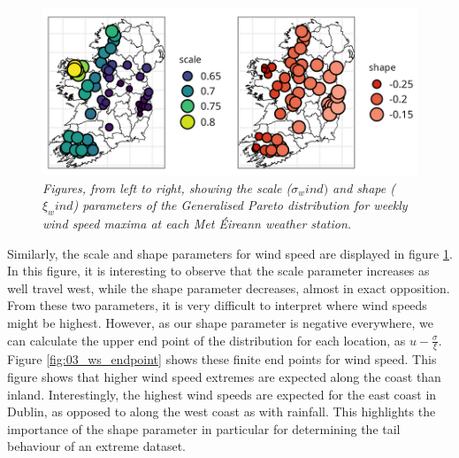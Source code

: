 \documentclass{article}
\numberwithin{equation}{section}
\begin{document}
\begin{figure}[H]
    \centering
    \includegraphics[width = 0.9\linewidth]{plots/033_gpd_ws_crop.png}
    \caption{\emph{Figures, from left to right, showing the scale ($\sigma_wind)$ and shape ($\xi_wind$) parameters of the Generalised Pareto distribution for weekly wind speed maxima at each Met Éireann weather station.}}
    \label{fig:03_gpd_ws}
\end{figure}

Similarly, the scale and shape parameters for wind speed are displayed in figure \ref{fig:03_gpd_ws}.
In this figure, it is interesting to observe that the scale parameter increases as well travel west, while the shape parameter decreases, almost in exact opposition.
From these two parameters, it is very difficult to interpret where wind speeds might be highest. 
However, as our shape parameter is negative everywhere, we can calculate the upper end point of the distribution for each location, as $u - \frac{\sigma}{\xi}$.
Figure \ref{fig:03_ws_endpoint} shows these finite end points for wind speed.
This figure shows that higher wind speed extremes are expected along the coast than inland. 
Interestingly, the highest wind speeds are expected for the east coast in Dublin, as opposed to along the west coast as with rainfall.
This highlights the importance of the shape parameter in particular for determining the tail behaviour of an extreme dataset.
\end{document}
